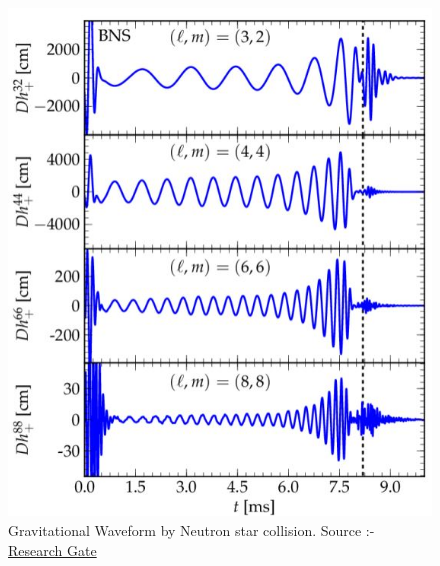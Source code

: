 \begin{figure}[h]
    \centering
    \includegraphics[scale=0.74]{images.tex/WAVEFORM.jpeg}
    \caption{Gravitational Waveform by Neutron star collision. Source :- \href{https://www.researchgate.net/figure/Binary-neutron-stars-GW-modes-m-3-2-4-4-6-6-8-8-of-polarization_fig13_233846764}{Research Gate}}
\end{figure}

\pagebreak
